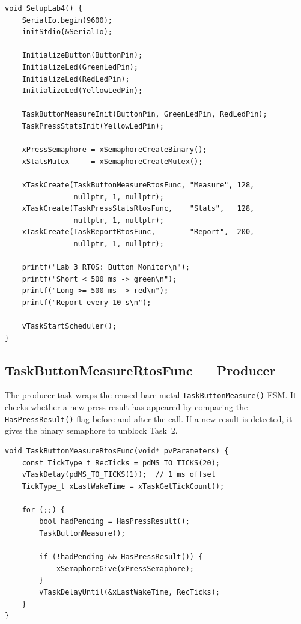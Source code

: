 \documentclass[12pt]{article}
\begin{document}
\begin{lstlisting}[caption={SetupLab4 — Task creation and scheduler launch}]
void SetupLab4() {
    SerialIo.begin(9600);
    initStdio(&SerialIo);

    InitializeButton(ButtonPin);
    InitializeLed(GreenLedPin);
    InitializeLed(RedLedPin);
    InitializeLed(YellowLedPin);

    TaskButtonMeasureInit(ButtonPin, GreenLedPin, RedLedPin);
    TaskPressStatsInit(YellowLedPin);

    xPressSemaphore = xSemaphoreCreateBinary();
    xStatsMutex     = xSemaphoreCreateMutex();

    xTaskCreate(TaskButtonMeasureRtosFunc, "Measure", 128,
                nullptr, 1, nullptr);
    xTaskCreate(TaskPressStatsRtosFunc,    "Stats",   128,
                nullptr, 1, nullptr);
    xTaskCreate(TaskReportRtosFunc,        "Report",  200,
                nullptr, 1, nullptr);

    printf("Lab 3 RTOS: Button Monitor\n");
    printf("Short < 500 ms -> green\n");
    printf("Long >= 500 ms -> red\n");
    printf("Report every 10 s\n");

    vTaskStartScheduler();
}
\end{lstlisting}

\subsection{TaskButtonMeasureRtosFunc — Producer}

The producer task wraps the reused bare-metal \texttt{TaskButtonMeasure()} FSM. It checks whether a new press result has appeared by comparing the \texttt{HasPressResult()} flag before and after the call. If a new result is detected, it gives the binary semaphore to unblock Task~2.

\begin{lstlisting}[caption={TaskButtonMeasureRtosFunc — FreeRTOS producer wrapper}]
void TaskButtonMeasureRtosFunc(void* pvParameters) {
    const TickType_t RecTicks = pdMS_TO_TICKS(20);
    vTaskDelay(pdMS_TO_TICKS(1));  // 1 ms offset
    TickType_t xLastWakeTime = xTaskGetTickCount();

    for (;;) {
        bool hadPending = HasPressResult();
        TaskButtonMeasure();

        if (!hadPending && HasPressResult()) {
            xSemaphoreGive(xPressSemaphore);
        }
        vTaskDelayUntil(&xLastWakeTime, RecTicks);
    }
}
\end{lstlisting}
\end{document}

